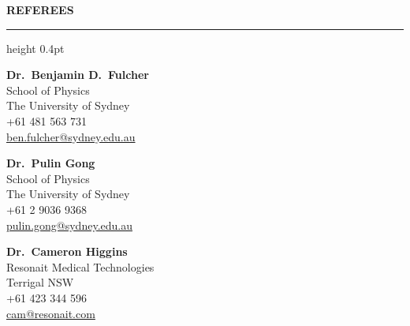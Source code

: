 \documentclass[10pt,a4paper]{article}
\renewcommand{\section}[1]{%
  \par\vspace{8pt}%
  {\small\bfseries\MakeUppercase{#1}}\par
  \vspace{4pt}\hrule height 0.4pt\vspace{2pt}}
\begin{document}
\vspace{2pt}

\section{Referees}
\noindent\begin{minipage}[t]{0.32\textwidth}
\textbf{Dr.\ Benjamin D.\ Fulcher}\\
\small School of Physics\\
The University of Sydney\\
+61 481 563 731\\
\href{mailto:ben.fulcher@sydney.edu.au}{ben.fulcher@sydney.edu.au}
\end{minipage}\hfill
\begin{minipage}[t]{0.32\textwidth}
\centering
\textbf{Dr.\ Pulin Gong}\\
\small School of Physics\\
The University of Sydney\\
+61 2 9036 9368\\
\href{mailto:pulin.gong@sydney.edu.au}{pulin.gong@sydney.edu.au}
\end{minipage}\hfill
\begin{minipage}[t]{0.32\textwidth}
\raggedleft
\textbf{Dr.\ Cameron Higgins}\\
\small Resonait Medical Technologies\\
Terrigal NSW\\
+61 423 344 596\\
\href{mailto:cam@resonait.com}{cam@resonait.com}
\end{minipage}
\end{document}
